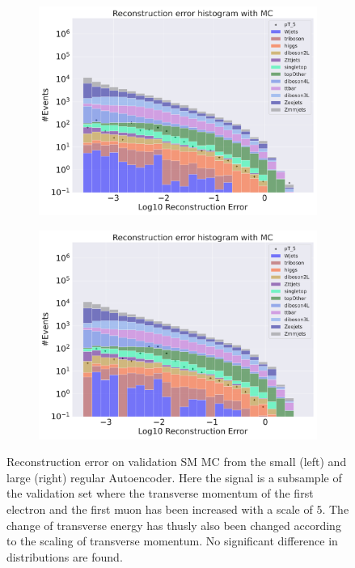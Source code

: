 \begin{figure}[h!]
    \centering
    \begin{subfigure}{.45\textwidth}
        \includegraphics[width=\textwidth]{Figures/AE_testing/small/b_data_recon_big_rm3_feats_sig_pT_5.pdf}
        \caption{ }
        \label{fig:ae_small_pt_5}
    \end{subfigure}
    \hfill 
    \begin{subfigure}{.45\textwidth}
        \includegraphics[width=\textwidth]{Figures/AE_testing/big/b_data_recon_big_rm3_feats_sig_pT_5.pdf}
        \caption{}
        \label{fig:ae_big_pt_5}
    \end{subfigure}
    \hfill 
    \caption[AE | Reconstruction error $p_T$ altering of 5]{Reconstruction error on validation SM MC from the small (left) and large (right) regular Autoencoder. Here the signal is a subsample of the validation 
    set where the transverse momentum of the first electron and the first muon has been increased with a scale of $5$. The change of transverse 
    energy has thusly also been changed according to the scaling of transverse momentum. No significant difference in distributions are found. }
    \label{fig:ae_big_small_pt_5}
\end{figure}


